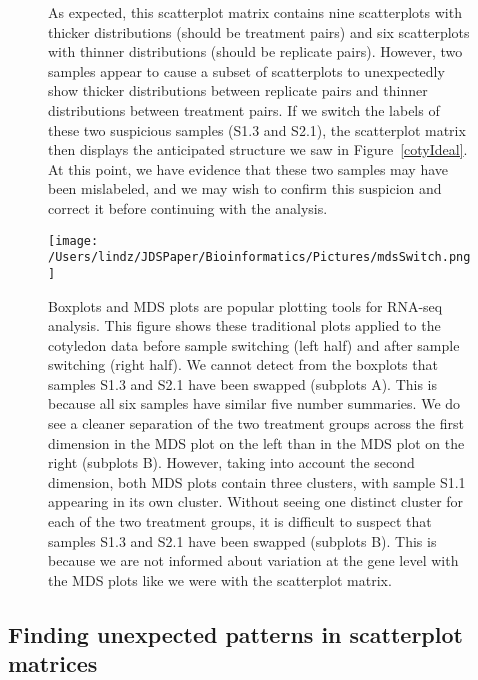 \documentclass[referee]{biom}
\begin{document}
\begin{figure}
\begin{center}
\centerline{}
\end{center}
\caption{As expected, this scatterplot matrix contains nine scatterplots with thicker distributions (should be treatment pairs) and six scatterplots with thinner distributions (should be replicate pairs). However, two samples appear to cause a subset of scatterplots to unexpectedly show thicker distributions between replicate pairs and thinner distributions between treatment pairs. If we switch the labels of these two suspicious samples (S1.3 and S2.1), the scatterplot matrix then displays the anticipated structure we saw in Figure~\ref{cotyIdeal}. At this point, we have evidence that these two samples may have been mislabeled, and we may wish to confirm this suspicion and correct it before continuing with the analysis.
\label{switchedScatMat}}
\end{figure}

\begin{figure}
\begin{center}
\centerline{\texttt{[image: /Users/lindz/JDSPaper/Bioinformatics/Pictures/mdsSwitch.png]}}
\end{center}
\caption{Boxplots and MDS plots are popular plotting tools for RNA-seq analysis. This figure shows these traditional plots applied to the cotyledon data before sample switching (left half) and after sample switching (right half). We cannot detect from the boxplots that samples S1.3 and S2.1 have been swapped (subplots A). This is because all six samples have similar five number summaries. We do see a cleaner separation of the two treatment groups across the first dimension in the MDS plot on the left than in the MDS plot on the right (subplots B). However, taking into account the second dimension, both MDS plots contain three clusters, with sample S1.1 appearing in its own cluster. Without seeing one distinct cluster for each of the two treatment groups, it is difficult to suspect that samples S1.3 and S2.1 have been swapped (subplots B). This is because we are not informed about variation at the gene level with the MDS plots like we were with the scatterplot matrix.
\label{mdsSwitch}}
\end{figure}

\subsection{Finding unexpected patterns in scatterplot matrices}
\label{s:Finding unexpected patterns in scatterplot matrices}
\end{document}

